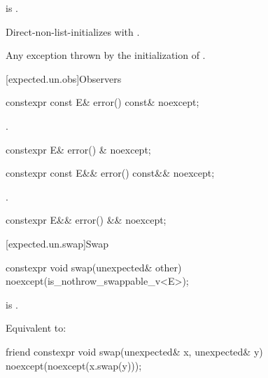 \begin{itemdescr}
\pnum
\constraints
{} is .

\pnum
\effects
Direct-non-list-initializes  with .

\pnum
\throws
Any exception thrown by the initialization of .
\end{itemdescr}

[expected.un.obs]{Observers}

%
\begin{itemdecl}
constexpr const E& error() const& noexcept;
\end{itemdecl}

\begin{itemdescr}
\pnum
\returns
{}.
\end{itemdescr}

%
\begin{itemdecl}
constexpr E& error() & noexcept;
\end{itemdecl}

%
\begin{itemdecl}
constexpr const E&& error() const&& noexcept;
\end{itemdecl}

\begin{itemdescr}
\pnum
\returns
{}.
\end{itemdescr}

%
\begin{itemdecl}
constexpr E&& error() && noexcept;
\end{itemdecl}

[expected.un.swap]{Swap}

%
\begin{itemdecl}
constexpr void swap(unexpected& other) noexcept(is_nothrow_swappable_v<E>);
\end{itemdecl}

\begin{itemdescr}
\pnum
\mandates
{} is .

\pnum
\effects
Equivalent to: 
\end{itemdescr}

%
\begin{itemdecl}
friend constexpr void swap(unexpected& x, unexpected& y) noexcept(noexcept(x.swap(y)));
\end{itemdecl}

